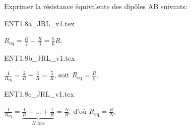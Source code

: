 \hauteurLargeurCadreReponse		{10mm}{40mm}
\typeEntrainement				{} %
\initialisationEntrainement

Exprimer la résistance équivalente des dipôles AB suivants: 

\debutEntrainement


\begin{enonce}
{ENT1.8a_JRL_v1.tex}
\end{enonce}


\begin{corrige}
	$R_\text{eq}=\frac{R}{2}+\frac{R}{3}=\frac56 R$.
\end{corrige}


\begin{enonce}
{ENT1.8b_JRL_v1.tex}
\end{enonce}


\begin{corrige}
	$\frac{1}{R_\text{eq}}=\frac{2}{R}+\frac{3}{R}=\frac{5}{R}$, soit $R_\text{eq}=\frac{R}{5}$.
\end{corrige}


\begin{enonce}
{ENT1.8c_JRL_v1.tex}
\end{enonce}


\begin{corrige}
	$\frac{1}{R_\text{eq}}=\underbrace{\frac{1}{R}+\ldots+\frac{1}{R}}_{N\text{ fois}}=\frac{N}{R}$, d'où $R_\text{eq}=\frac{R}{N}$.	
\end{corrige}

